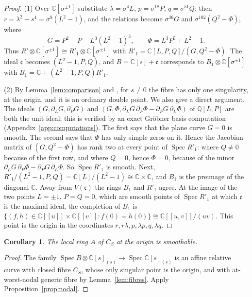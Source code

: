 \documentclass{amsart}
\newtheorem{corollary}[theorem]{Corollary}
\theoremstyle{definition}
\theoremstyle{remark}
\numberwithin{equation}{section}
\newcommand{\C}{\mathbb{C}}
\newcommand{\cc}{\mathfrak{c}}
\DeclareMathOperator{\Spec}{Spec}
\begin{document}
\begin{proof}
(1) Over $\C[\sigma^{\pm1}]$ substitute $\lambda=\sigma^4L$, $p=\sigma^{18}P$, $q=\sigma^{51}Q$; then $r=\lambda^2-s^4=\sigma^8(L^2-1)$, and the relations become $\sigma^{36}G$ and $\sigma^{102}(Q^2-\Phi)$, where
\[
G=P^2-P-L^3(L^2-1)^3,\qquad \Phi=L^3P^5+L^2-1 .
\]
Thus $R'\otimes\C[\sigma^{\pm1}]\cong R'_1\otimes\C[\sigma^{\pm1}]$ with $R'_1=\C[L,P,Q]/(G,Q^2-\Phi)$. The ideal $\cc$ becomes $(L^2-1,P,Q)$, and $B=\C[s]+\cc$ corresponds to $B_1\otimes\C[\sigma^{\pm1}]$ with $B_1=\C+(L^2-1,P,Q)R'_1$.

(2) By Lemma~\ref{lem:comparison} and \cite[Example~2.13]{Ste}, for $s\ne0$ the fibre has only one singularity, at the origin, and it is an ordinary double point. We also give a direct argument. The ideals $(G,\partial_LG,\partial_PG)$ and $(G,\Phi,\partial_LG\,\partial_P\Phi-\partial_PG\,\partial_L\Phi)$ of $\mathbb Q[L,P]$ are both the unit ideal; this is verified by an exact Gr\"obner basis computation (Appendix~\ref{app:computations}). The first says that the plane curve $G=0$ is smooth. The second says that $\Phi$ has only simple zeros on it. Hence the Jacobian matrix of $(G,Q^2-\Phi)$ has rank two at every point of $\Spec R'_1$: where $Q\ne0$ because of the first row, and where $Q=0$, hence $\Phi=0$, because of the minor $\partial_LG\,\partial_P\Phi-\partial_PG\,\partial_L\Phi$. So $\Spec R'_1$ is smooth. Next, $R'_1/(L^2-1,P,Q)=\C[L]/(L^2-1)\cong\C\times\C$, and $B_1$ is the preimage of the diagonal $\C$. Away from $V(\cc)$ the rings $B_1$ and $R'_1$ agree. At the image of the two points $L=\pm1$, $P=Q=0$, which are smooth points of $\Spec R'_1$ at which $\cc$ is the maximal ideal, the completion of $B_1$ is $\{(f,h)\in\C[[u]]\times\C[[v]]:f(0)=h(0)\}\cong\C[[u,v]]/(uv)$. This point is the origin in the coordinates $r,r\lambda,p,\lambda p,q,\lambda q$.
\end{proof}

\begin{corollary}\label{cor:base-smoothable}
The local ring $A$ of $C_S$ at the origin is smoothable.
\end{corollary}

\begin{proof}
The family $\Spec B\otimes\C[s]_{(s)}\to\Spec\C[s]_{(s)}$ is an affine relative curve with closed fibre $C_S$, whose only singular point is the origin, and with at-worst-nodal generic fibre by Lemma~\ref{lem:fibres}. Apply Proposition~\ref{prop:nodal}.
\end{proof}
\end{document}

